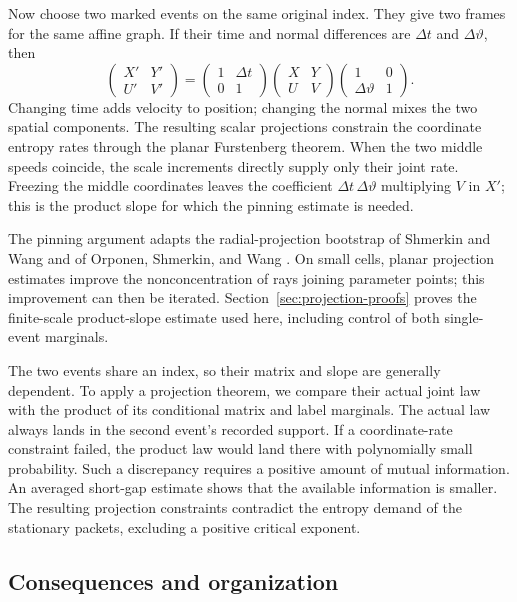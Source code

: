 Now choose two marked events on the same original index. They give two
frames for the same affine graph. If their time and normal differences
are \(\Delta t\) and \(\Delta\vartheta\), then
\[
\begin{pmatrix}X'&Y'\\ U'&V'\end{pmatrix}
=
\begin{pmatrix}1&\Delta t\\0&1\end{pmatrix}
\begin{pmatrix}X&Y\\U&V\end{pmatrix}
\begin{pmatrix}1&0\\\Delta\vartheta&1\end{pmatrix}.
\]
Changing time adds velocity to position; changing the normal mixes the
two spatial components. The resulting scalar projections constrain the
coordinate entropy rates through the planar Furstenberg theorem.
When the two middle speeds coincide, the scale increments directly
supply only their joint rate. Freezing the middle coordinates leaves the
coefficient \(\Delta t\,\Delta\vartheta\) multiplying \(V\) in \(X'\);
this is the product slope for which the pinning estimate is needed.

The pinning argument adapts the radial-projection bootstrap of
Shmerkin and Wang \citep[Section~5.4]{SW2025} and of
Orponen, Shmerkin, and Wang \citep[Section~1.3]{OSW2024}.
On small cells, planar projection estimates improve the nonconcentration
of rays joining parameter points; this improvement can then be iterated.
Section~\ref{sec:projection-proofs} proves the finite-scale product-slope
estimate used here, including control of both single-event marginals.

The two events share an index, so their matrix and slope are generally
dependent. To apply a projection theorem, we compare their actual joint
law with the product of its conditional matrix and label marginals.
The actual law always lands in the second event's recorded support. If
a coordinate-rate constraint failed, the product law would land there
with polynomially small probability. Such a discrepancy requires a
positive amount of mutual information. An averaged short-gap estimate
shows that the available information is smaller. The resulting
projection constraints contradict the entropy demand of the stationary
packets, excluding a positive critical exponent.

\subsection{Consequences and organization}

